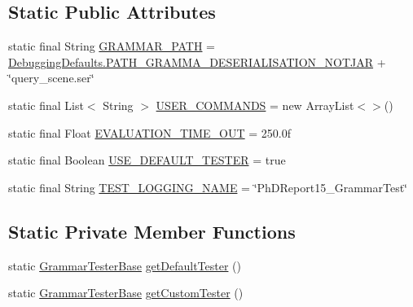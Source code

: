 \subsection*{Static Public Attributes}
\begin{DoxyCompactItemize}
\item 
static final String \hyperlink{classit_1_1emarolab_1_1cagg_1_1example_1_1GrammarTest_a6b2621e3a1e229630bab2da06bd0acf6}{G\-R\-A\-M\-M\-A\-R\-\_\-\-P\-A\-T\-H} = \hyperlink{classit_1_1emarolab_1_1cagg_1_1debugging_1_1DebuggingDefaults_a8cf820f63cd9d9288cea388c2b44e585}{Debugging\-Defaults.\-P\-A\-T\-H\-\_\-\-G\-R\-A\-M\-M\-A\-\_\-\-D\-E\-S\-E\-R\-I\-A\-L\-I\-S\-A\-T\-I\-O\-N\-\_\-\-N\-O\-T\-J\-A\-R} + \char`\"{}query\-\_\-scene.\-ser\char`\"{}
\item 
static final List$<$ String $>$ \hyperlink{classit_1_1emarolab_1_1cagg_1_1example_1_1GrammarTest_a6084df26a61e4708954ed9aa8d128734}{U\-S\-E\-R\-\_\-\-C\-O\-M\-M\-A\-N\-D\-S} = new Array\-List$<$$>$()
\item 
static final Float \hyperlink{classit_1_1emarolab_1_1cagg_1_1example_1_1GrammarTest_a700ef05420c3f7fef7bd7c0bfe80aa2d}{E\-V\-A\-L\-U\-A\-T\-I\-O\-N\-\_\-\-T\-I\-M\-E\-\_\-\-O\-U\-T} = 250.\-0f
\item 
static final Boolean \hyperlink{classit_1_1emarolab_1_1cagg_1_1example_1_1GrammarTest_a377d05850775b10a1617a3dac6af9ff2}{U\-S\-E\-\_\-\-D\-E\-F\-A\-U\-L\-T\-\_\-\-T\-E\-S\-T\-E\-R} = true
\item 
static final String \hyperlink{classit_1_1emarolab_1_1cagg_1_1example_1_1GrammarTest_a3b8263975e23aa494ceae78879f1297d}{T\-E\-S\-T\-\_\-\-L\-O\-G\-G\-I\-N\-G\-\_\-\-N\-A\-M\-E} = \char`\"{}Ph\-D\-Report15\-\_\-\-Grammar\-Test\char`\"{}
\end{DoxyCompactItemize}
\subsection*{Static Private Member Functions}
\begin{DoxyCompactItemize}
\item 
static \hyperlink{classit_1_1emarolab_1_1cagg_1_1core_1_1evaluation_1_1interfacing_1_1GrammarTesterBase}{Grammar\-Tester\-Base} \hyperlink{classit_1_1emarolab_1_1cagg_1_1example_1_1GrammarTest_ad525bea17cdd461cc8b9d5cde37e3751}{get\-Default\-Tester} ()
\item 
static \hyperlink{classit_1_1emarolab_1_1cagg_1_1core_1_1evaluation_1_1interfacing_1_1GrammarTesterBase}{Grammar\-Tester\-Base} \hyperlink{classit_1_1emarolab_1_1cagg_1_1example_1_1GrammarTest_a7555c82015634ffab41a0176528f4cfb}{get\-Custom\-Tester} ()
\end{DoxyCompactItemize}


